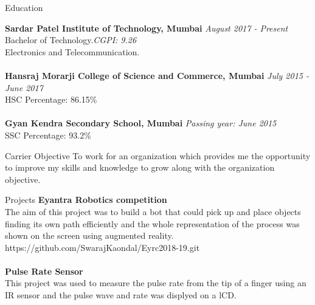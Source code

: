 \documentclass{resume} %
\begin{document}

\begin{rSection}{Education}

{\bf Sardar Patel Institute of Technology, Mumbai} \hfill {\em August 2017 - Present} 
\\ Bachelor of Technology.\hfill {\em CGPI: 9.26}
\\ Electronics and Telecommunication.\\
\\{\bf Hansraj Morarji College of Science and Commerce, Mumbai} \hfill {\em July 2015 - June 2017} 
\\ HSC\hfill { Percentage: 86.15\% }
\\
\\{\bf Gyan Kendra Secondary School, Mumbai} \hfill {\em Passing year: June 2015} 
\\ SSC\hfill { Percentage: 93.2\% }


\end{rSection}

\begin{rSection}{Carrier Objective}
 To work for an organization which provides me the opportunity to improve my skills and knowledge to grow along with the organization objective.
\end{rSection}
\begin{rSection}{Projects}
{\bf Eyantra Robotics competition}
\\The aim of this project was to build a bot that could pick up and place objects finding its own path efficiently and the whole representation of the process was shown on the screen using augmented reality.\\https://github.com/SwarajKaondal/Eyrc2018-19.git\\
\\{\bf Pulse Rate Sensor}\\
This project was used to measure the pulse rate from the tip of a finger using an IR sensor and the pulse wave and rate was displyed on a lCD.\\

\end{rSection}
\end{document}
